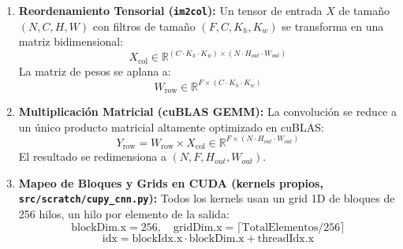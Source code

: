 \documentclass[
  11pt,
]{article}
\begin{document}
\begin{enumerate}
\def\labelenumi{\arabic{enumi}.}
\item
  \textbf{Reordenamiento Tensorial (\texttt{im2col}):} Un
  tensor de entrada \(X\) de tamaño \((N, C, H, W)\) con
  filtros de tamaño \((F, C, K_h, K_w)\) se transforma en
  una matriz bidimensional:
  \[X_{\text{col}} \in \mathbb{R}^{(C \cdot K_h \cdot K_w) \times (N \cdot H_{out} \cdot W_{out})}\]
  La matriz de pesos se aplana a:
  \[W_{\text{row}} \in \mathbb{R}^{F \times (C \cdot K_h \cdot K_w)}\]
\item
  \textbf{Multiplicación Matricial (cuBLAS GEMM):} La
  convolución se reduce a un único producto matricial
  altamente optimizado en cuBLAS:
  \[Y_{\text{row}} = W_{\text{row}} \times X_{\text{col}} \in \mathbb{R}^{F \times (N \cdot H_{out} \cdot W_{out})}\]
  El resultado se redimensiona a
  \((N, F, H_{out}, W_{out})\).
\item
  \textbf{Mapeo de Bloques y Grids en CUDA (kernels propios,
  \texttt{src/scratch/cupy\_cnn.py}):} Todos los kernels
  usan un grid 1D de bloques de 256 hilos, un hilo por
  elemento de la salida:
  \[\text{blockDim.x} = 256, \quad \text{gridDim.x} = \lceil \text{TotalElementos} / 256 \rceil\]
  \[\text{idx} = \text{blockIdx.x} \cdot \text{blockDim.x} + \text{threadIdx.x}\]


\end{enumerate}
\end{document}
